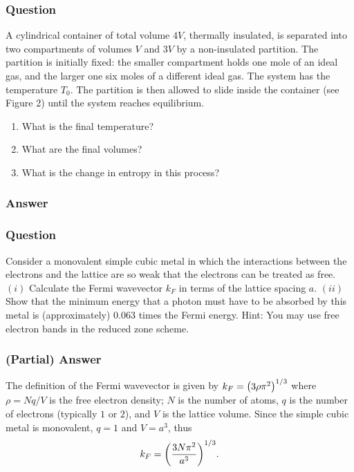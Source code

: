 \subsubsection{Question}
A cylindrical container of total volume $4V$, thermally insulated, is separated into two compartments of volumes $V$ and $3V$ by a non-insulated partition. The partition is initially fixed: the smaller compartment holds one mole of an ideal gas, and the larger one six moles of a different ideal gas. The system has the temperature $T_0$. The partition is then allowed to slide inside the container (see Figure 2) until the system reaches equilibrium.
\begin{enumerate}
	\item What is the final temperature?
	\item What are the final volumes?
	\item What is the change in entropy in this process? 
\end{enumerate}
\subsubsection{Answer}



\subsubsection{Question}
Consider a monovalent simple cubic metal in which the interactions between the electrons and the lattice are so weak that the electrons can be treated as free. $(i)$ Calculate the Fermi wavevector $k_F$ in terms of the lattice spacing $a$. $(ii)$ Show that the minimum energy that a photon must have to be absorbed by this metal is (approximately) $0.063$ times the Fermi energy. Hint: You may use free electron bands in the reduced zone scheme.

\subsubsection{(Partial) Answer}
The definition of the Fermi wavevector is given by $k_F = \qty(3\rho \pi^2)^{1/3}$ where $\rho = Nq/V$ is the free electron density; $N$ is the number of atoms, $q$ is the number of electrons (typically $1$ or $2$), and $V$ is the lattice volume. Since the simple cubic metal is monovalent, $q =1$ and $V=a^3$, thus
\begin{equation}
	k_F = \qty(\frac{3N\pi^2}{a^3})^{1/3}.
\end{equation}



